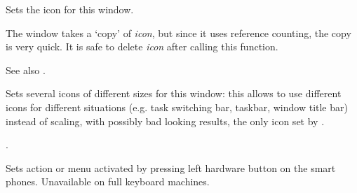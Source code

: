 

\label{wxtoplevelwindowseticon}


Sets the icon for this window.




The window takes a `copy' of {\it icon}, but since it uses reference
counting, the copy is very quick. It is safe to delete {\it icon} after
calling this function.

See also .


\label{wxtoplevelwindowseticons}


Sets several icons of different sizes for this window: this allows to use
different icons for different situations (e.g. task switching bar, taskbar,
window title bar) instead of scaling, with possibly bad looking results, the
only icon set by .




.


\label{wxtoplevelwindowsetleftmenu}


Sets action or menu activated by pressing left hardware button on the smart phones.
Unavailable on full keyboard machines.





